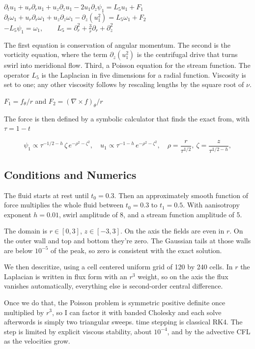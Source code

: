 $\partial_t u_1 + u_r\partial_r u_1 + u_z\partial_z u_1 - 2u_1\partial_z\psi_1 = L_5 u_1 + F_1$\\
$\partial_t \omega_1 + u_r\partial_r \omega_1 + u_z\partial_z \omega_1 - \partial_z(u_1^2) = L_5 \omega_1 + F_2$\\
$-L_5\psi_1=\omega_1,\qquad L_5=\partial_r^2+\tfrac3r\partial_r+\partial_z^2$

The first equation is conservation of angular momentum. The second is the vorticity equation, where the term $\partial_z(u_1^2)$ is the centrifugal drive that turns swirl into meridional flow. Third, a Poisson equation for the stream function. The operator $L_5$ is the Laplacian in five dimensions for a radial function. Viscosity is set to one; any other viscosity follows by rescaling lengths by the square root of $\nu$.

$F_1 = f_\theta/r$ and $F_2 = (\nabla\times f)_\theta/r$

The force is then defined by a symbolic calculator that finds the exact from, with $\tau = 1-t$

\[
	\psi_1\propto \tau^{-1/2-h}\,\zeta\,e^{-\rho^2-\zeta^2},\quad
	u_1\propto \tau^{-1-h}\,e^{-\rho^2-\zeta^2},\quad \rho=\frac{r}{\tau^{1/2}},\ \zeta=\frac{z}{\tau^{1/2-h}},
\]

\subsection{Conditions and Numerics}

The fluid starts at rest until $t_0=0.3$. Then an approximately smooth function of force multiplies the whole fluid between $t_0 = 0.3$ to $t_1 = 0.5$. With aanisotropy exponent $h=0.01$, swirl amplitude of 8, and a stream function amplitude of 5.

The domain is $r\in[0,3]$, $z\in[-3,3]$. On the axis the fields are even in $r$. On the outer wall and top and bottom they're zero. The Gaussian tails at those walls are below $10^{-5}$ of the peak, so zero is consistent with the exact solution.

We then descritize, using a cell centered uniform grid of 120 by 240 cells. In $r$ the Laplacian is written in flux form with an $r^3$ weight, so on the axis the flux vanishes automatically, everything else is second-order central difference.

Once we do that, the Poisson problem is symmetric positive definite once multiplied by $r^3$, so I can factor it with banded Cholesky and each solve afterwords is simply two triangular sweeps. time stepping is classical RK4. The step is limited by explicit viscous stability, about $10^{-4}$, and by the advective CFL as the velocities grow.
